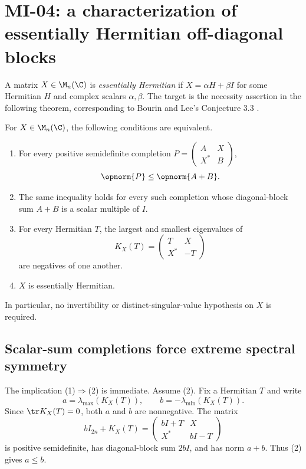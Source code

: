 \section{MI-04: a characterization of essentially Hermitian off-diagonal blocks}
\label{sec:mi04}

A matrix $X\in\M_n(\C)$ is \emph{essentially Hermitian} if
$X=\alpha H+\beta I$ for some Hermitian $H$ and complex scalars $\alpha,\beta$.
The target is the necessity assertion in the following theorem, corresponding to Bourin and Lee's Conjecture 3.3 \cite{BL2021}.

\begin{theorem}\label{thm:mi04}
For $X\in\M_n(\C)$, the following conditions are equivalent.
\begin{enumerate}
\item For every positive semidefinite completion
$P=\begin{pmatrix}A&X\\X^*&B\end{pmatrix}$,
\[
 \opnorm{P}\leq\opnorm{A+B}.
\]
\item The same inequality holds for every such completion whose diagonal-block sum $A+B$ is a scalar multiple of $I$.
\item For every Hermitian $T$, the largest and smallest eigenvalues of
\[
 K_X(T)=\begin{pmatrix}T&X\\X^*&-T\end{pmatrix}
\]
are negatives of one another.
\item $X$ is essentially Hermitian.
\end{enumerate}
In particular, no invertibility or distinct-singular-value hypothesis on $X$ is required.
\end{theorem}

\subsection{Scalar-sum completions force extreme spectral symmetry}

The implication (1)$\Rightarrow$(2) is immediate. Assume (2). Fix a Hermitian $T$ and write
\[
 a=\lambda_{\max}(K_X(T)),\qquad b=-\lambda_{\min}(K_X(T)).
\]
Since $\tr K_X(T)=0$, both $a$ and $b$ are nonnegative. The matrix
\[
 bI_{2n}+K_X(T)
 =\begin{pmatrix}bI+T&X\\X^*&bI-T\end{pmatrix}
\]
is positive semidefinite, has diagonal-block sum $2bI$, and has norm $a+b$. Thus (2) gives $a\leq b$.

